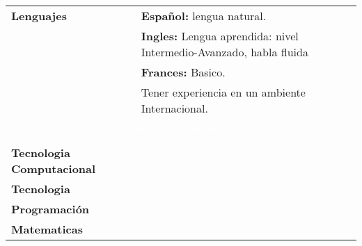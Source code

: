 \documentclass[twoside,a4paper,openright,10pt]{report}
\begin{document}
\begin{table}[ht]
\begin{tabular}{p{40mm} p{140mm}}
\textbf{Lenguajes} & \textbf{Español:} lengua natural.\\
& \textbf{Ingles:} Lengua aprendida: nivel Intermedio-Avanzado, habla fluida \\
& \textbf{Frances:} Basico.\\
& Tener experiencia en un ambiente Internacional.

\\
\multicolumn{2}{c}{\cellcolor{black} \textcolor{white}{Intereses y Actividades}}\\ \\

\textbf{Tecnologia Computacional}\\
\textbf{Tecnologia}\\
\textbf{Programación}\\
\textbf{Matematicas}

\end{tabular}
\end{table}
\end{document}
